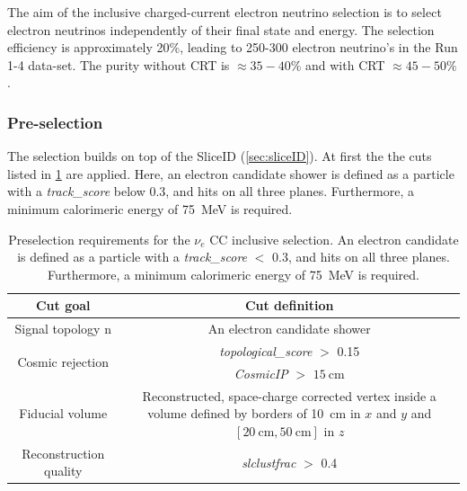 \label{sec:nueselection:inclusive}


\newcommand{\nueccinc}{$\nu_e$ CC inclusive\xspace}
\newcommand{\nueccsel}{$\nu_e$ CC inclusive selection\xspace}


The aim of the inclusive charged-current electron neutrino selection is to select electron neutrinos independently of their final state and energy. The selection efficiency is approximately 20\%, leading to 250-300 electron neutrino's in the Run 1-4 data-set. The purity without CRT is $\approx 35-40\%$ and with CRT $\approx 45-50\%$.


\subsubsection{Pre-selection}
The selection builds on top of the SliceID (\cref{sec:sliceID}). At first the the cuts listed in \cref{tab:nuecc:presel} are applied. Here, an electron candidate shower is defined as a particle with a \textit{track\_score} below 0.3, and hits on all three planes. Furthermore, a minimum calorimeric energy of \SI{75}{\MeV} is required. 

\begin{table}[h!]
\centering
\setlength{\tabcolsep}{10pt}
\renewcommand{\arraystretch}{1.25}
 \begin{tabular}{| c | c |} 
 \hline
 Cut goal & Cut definition \\
 \hline\hline
Signal topology n & An electron candidate shower \\
 \hline
\multirow{2}{*}{Cosmic rejection} & \textit{topological\_score} $>$ 0.15 \\
 & \textit{CosmicIP} $>$ $\SI{15}{\cm}$ \\
 \hline
Fiducial volume & \makecell{Reconstructed, space-charge corrected vertex \\ inside a volume defined by borders of \\ \SI{10}{\cm} in $x$ and $y$ and $[ \SI{20}{\cm}, \SI{50}{\cm}]$ in $z$} \\
 \hline
Reconstruction quality & \textit{slclustfrac} $>$ 0.4 \\
 \hline
 \end{tabular}
 \caption{\label{tab:nuecc:presel} Preselection requirements for the \nueccsel. An electron candidate is defined as a particle with a \textit{track\_score} $<$ 0.3, and hits on all three planes. Furthermore, a minimum calorimeric energy of \SI{75}{\MeV} is required. }
\end{table}


